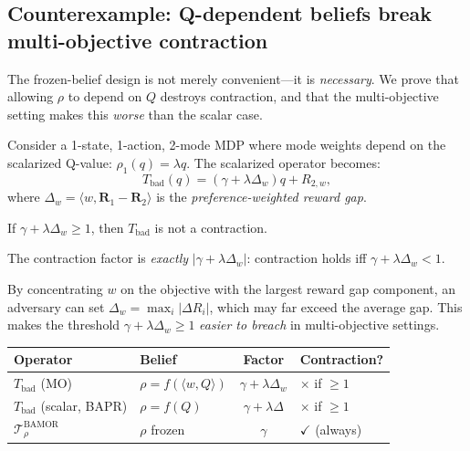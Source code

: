 \subsection{Counterexample: Q-dependent beliefs break multi-objective contraction}
\label{sec:counterexample}

The frozen-belief design is not merely convenient---it is \emph{necessary}.  We prove that allowing $\rho$ to depend on $Q$ destroys contraction, and that the multi-objective setting makes this \emph{worse} than the scalar case.

\begin{definition}
Consider a 1-state, 1-action, 2-mode MDP where mode weights depend on the scalarized Q-value: $\rho_1(q) = \lambda q$.  The scalarized operator becomes:
\begin{equation}
    T_{\mathrm{bad}}(q) = (\gamma + \lambda \Delta_w) q + R_{2,w},
\end{equation}
where $\Delta_w = \langle w, \mathbf{R}_1 - \mathbf{R}_2 \rangle$ is the \emph{preference-weighted reward gap}.
\end{definition}

\begin{theorem}
\label{thm:counter}
If $\gamma + \lambda\Delta_w \ge 1$, then $T_{\mathrm{bad}}$ is not a contraction.
\end{theorem}

\begin{theorem}
\label{thm:sharp}
The contraction factor is \emph{exactly} $|\gamma + \lambda\Delta_w|$: contraction holds iff $\gamma + \lambda\Delta_w < 1$.
\end{theorem}

\begin{theorem}
\label{thm:amplification}
By concentrating $w$ on the objective with the largest reward gap component, an adversary can set $\Delta_w = \max_i |\Delta R_i|$, which may far exceed the average gap.  This makes the threshold $\gamma + \lambda\Delta_w \ge 1$ \emph{easier to breach} in multi-objective settings.
\end{theorem}

\begin{center}
\begin{tabular}{llcl}
\toprule
\textbf{Operator} & \textbf{Belief} & \textbf{Factor} & \textbf{Contraction?} \\
\midrule
$T_{\mathrm{bad}}$ (MO) & $\rho = f(\langle w, Q \rangle)$ & $\gamma + \lambda\Delta_w$ & $\times$ if $\ge 1$ \\
$T_{\mathrm{bad}}$ (scalar, BAPR) & $\rho = f(Q)$ & $\gamma + \lambda\Delta$ & $\times$ if $\ge 1$ \\
$\mathcal{T}^{\mathrm{BAMOR}}_\rho$ & $\rho$ frozen & $\gamma$ & $\checkmark$ (always) \\
\bottomrule
\end{tabular}
\end{center}

